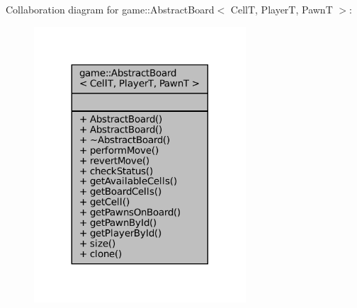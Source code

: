 Collaboration diagram for game\+:\+:Abstract\+Board$<$ CellT, PlayerT, PawnT $>$\+:
\nopagebreak
\begin{figure}[H]
\begin{center}
\leavevmode
\includegraphics[width=224pt]{classgame_1_1_abstract_board__coll__graph}
\end{center}
\end{figure}
